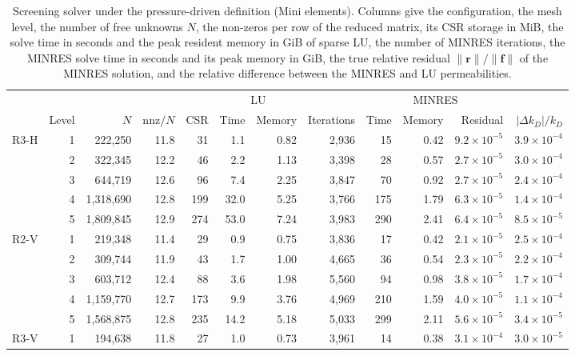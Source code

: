\begin{table}[htbp]
\centering
\caption{Screening solver under the pressure-driven definition (Mini elements). Columns give the configuration, the mesh level, the number of free unknowns $N$, the non-zeros per row of the reduced matrix, its CSR storage in MiB, the solve time in seconds and the peak resident memory in GiB of sparse LU, the number of MINRES iterations, the MINRES solve time in seconds and its peak memory in GiB, the true relative residual $\|\mathbf{r}\|/\|\mathbf{f}\|$ of the MINRES solution, and the relative difference between the MINRES and LU permeabilities.}
\label{tab:minres}
\footnotesize
\setlength{\tabcolsep}{4pt}
\begin{tabular}{lrrrrrrrrrrr}
\toprule
 & & & & & \multicolumn{2}{c}{LU} & \multicolumn{5}{c}{MINRES} \\
\cmidrule(lr){6-7}\cmidrule(lr){8-12}
 & Level & $N$ & nnz$/N$ & CSR & Time & Memory & Iterations & Time & Memory & Residual & $|\Delta k_D|/k_D$ \\
\midrule
R3-H & 1 & 222,250 & 11.8 & 31 & 1.1 & 0.82 & 2,936 & 15 & 0.42 & $9.2\times10^{-5}$ & $3.9\times10^{-4}$ \\
 & 2 & 322,345 & 12.2 & 46 & 2.2 & 1.13 & 3,398 & 28 & 0.57 & $2.7\times10^{-5}$ & $3.0\times10^{-4}$ \\
 & 3 & 644,719 & 12.6 & 96 & 7.4 & 2.25 & 3,847 & 70 & 0.92 & $2.7\times10^{-5}$ & $2.4\times10^{-4}$ \\
 & 4 & 1,318,690 & 12.8 & 199 & 32.0 & 5.25 & 3,766 & 175 & 1.79 & $6.3\times10^{-5}$ & $1.4\times10^{-4}$ \\
 & 5 & 1,809,845 & 12.9 & 274 & 53.0 & 7.24 & 3,983 & 290 & 2.41 & $6.4\times10^{-5}$ & $8.5\times10^{-5}$ \\
\midrule
R2-V & 1 & 219,348 & 11.4 & 29 & 0.9 & 0.75 & 3,836 & 17 & 0.42 & $2.1\times10^{-5}$ & $2.5\times10^{-4}$ \\
 & 2 & 309,744 & 11.9 & 43 & 1.7 & 1.00 & 4,665 & 36 & 0.54 & $2.3\times10^{-5}$ & $2.2\times10^{-4}$ \\
 & 3 & 603,712 & 12.4 & 88 & 3.6 & 1.98 & 5,560 & 94 & 0.98 & $3.8\times10^{-5}$ & $1.7\times10^{-4}$ \\
 & 4 & 1,159,770 & 12.7 & 173 & 9.9 & 3.76 & 4,969 & 210 & 1.59 & $4.0\times10^{-5}$ & $1.1\times10^{-4}$ \\
 & 5 & 1,568,875 & 12.8 & 235 & 14.2 & 5.18 & 5,033 & 299 & 2.11 & $5.6\times10^{-5}$ & $3.4\times10^{-5}$ \\
\midrule
R3-V & 1 & 194,638 & 11.8 & 27 & 1.0 & 0.73 & 3,961 & 14 & 0.38 & $3.1\times10^{-4}$ & $3.0\times10^{-5}$ \\

\end{tabular}
\end{table}
